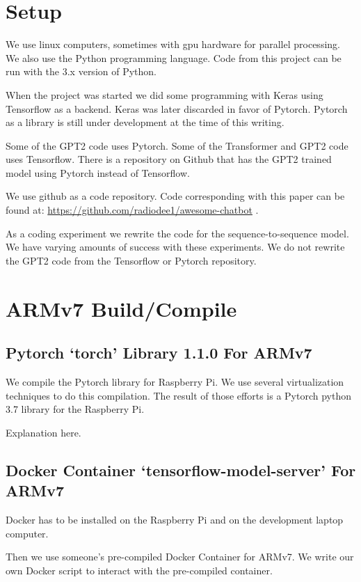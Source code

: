 \section{Setup}

We use linux computers, sometimes with gpu hardware for parallel processing.
We also use the Python programming language. Code from this project
can be run with the 3.x version of Python.

When the project was started we did some programming with Keras using
Tensorflow as a backend. Keras was later discarded in favor of Pytorch.
Pytorch as a library is still under development at the time of this
writing.

Some of the GPT2 code uses Pytorch. Some of the Transformer and GPT2 code uses Tensorflow. There
is a repository on Github that has the GPT2 trained model using Pytorch instead of Tensorflow.

We use github as a code repository. Code corresponding with this paper
can be found at: \href{https://github.com/radiodee1/awesome-chatbot}{https://github.com/radiodee1/awesome-chatbot}
. 

As a coding experiment we rewrite the code for the sequence-to-sequence model. We have varying amounts of success with these experiments. We do not rewrite the GPT2 code from the Tensorflow or Pytorch repository.

\section{ARMv7 Build/Compile}

\subsection*{Pytorch `torch' Library 1.1.0 For ARMv7}
We compile the Pytorch library for Raspberry Pi. We use several virtualization techniques to do this compilation. The result of those efforts is a Pytorch python 3.7 library for the Raspberry Pi.

Explanation here.

\subsection*{Docker Container `tensorflow-model-server' For ARMv7}
Docker has to be installed on the Raspberry Pi and on the development laptop computer.

Then we use someone's pre-compiled Docker Container for ARMv7. We write our own Docker script to interact with the pre-compiled container.


